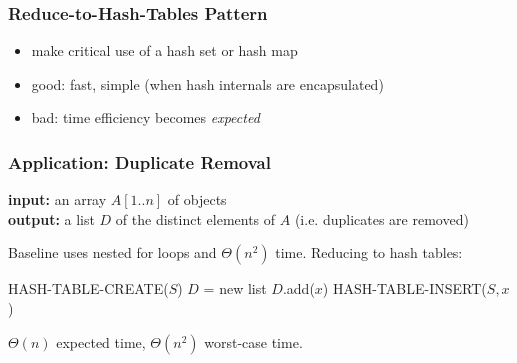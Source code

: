\documentclass[10pt]{beamer}
\begin{document}
\begin{frame} \frametitle{Reduce-to-Hash-Tables Pattern}
\begin{itemize}
  \item make critical use of a hash set or hash map
  \item good: fast, simple (when hash internals are encapsulated)
  \item bad: time efficiency becomes \emph{expected}
\end{itemize}
\end{frame}

\begin{frame} \frametitle{Application: Duplicate Removal}
  \textbf{input:} an array $A[1..n]$ of objects\\
  \textbf{output:} a list $D$ of the distinct elements of $A$ (i.e. duplicates
    are removed)\\
    \vspace{.3cm}

  Baseline uses nested for loops and $\Theta(n^2)$ time. Reducing to hash tables:
  \vspace{.3cm}

  {\footnotesize
  \begin{algorithmic}[1]
    \State HASH-TABLE-CREATE($S$)
    \State $D$ = new list
        \State $D$.add($x$)
        \State HASH-TABLE-INSERT($S, x$)
      \EndIf
    \EndFor
    \State {}
    \EndFunction
  \end{algorithmic}
  }
  \vspace{.3cm}
  $\Theta(n)$ expected time, $\Theta(n^2)$ worst-case time.
\end{frame}
\end{document}
